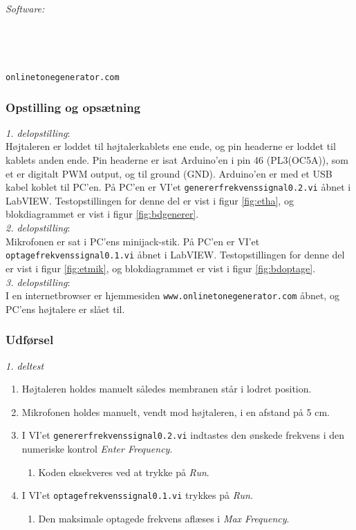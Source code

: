 		\textit{Software:}\\
		\labview\\
		\visa\\
		\vi\\
		\ardsw\\
		\texttt{onlinetonegenerator.com}
		
		\subsubsection{Opstilling og opsætning}
		\textit{1. delopstilling}:\\
		Højtaleren er loddet til højtalerkablets ene ende, og pin headerne er loddet til kablets anden ende. 
		Pin headerne er isat Arduino'en i pin 46 (PL3(OC5A)), som et er digitalt PWM output, og til ground (GND). 
		Arduino'en er med et USB kabel koblet til PC'en. 		
		På PC'en er VI'et \texttt{genererfrekvenssignal0.2.vi} åbnet i LabVIEW. Testopstillingen for denne del er vist i figur \ref{fig:etha}, og blokdiagrammet er vist i figur \ref{fig:bdgenerer}.\\ 
 
		\textit{2. delopstilling}:\\
		Mikrofonen er sat i PC'ens minijack-stik. På PC'en er VI'et \texttt{optagefrekvenssignal0.1.vi} åbnet i LabVIEW. Testopstillingen for denne del er vist i figur \ref{fig:etmik}, og blokdiagrammet er vist i figur \ref{fig:bdoptage}.\\  
		
		\textit{3. delopstilling}:\\
		I en internetbrowser er hjemmesiden \texttt{www.onlinetonegenerator.com} åbnet, og PC'ens højtalere er slået til. 
		
		\subsubsection{Udførsel}
			
			\textit{1. deltest}
			\begin{enumerate}
				\item Højtaleren holdes manuelt således membranen står i lodret position. 
				\item Mikrofonen holdes manuelt, vendt mod højtaleren, i en afstand på 5 cm. 
				\item I VI'et \texttt{genererfrekvenssignal0.2.vi} indtastes den ønskede frekvens i den numeriske kontrol \textit{Enter Frequency}. 
					\begin{enumerate}
						\item Koden eksekveres ved at trykke på \textit{Run}. 
					\end{enumerate} 
				\item I VI'et \texttt{optagefrekvenssignal0.1.vi} trykkes på \textit{Run}. 
					\begin{enumerate}
						\item Den maksimale optagede frekvens aflæses i \textit{Max Frequency}. 
					\end{enumerate}	 	
			\end{enumerate}
			
